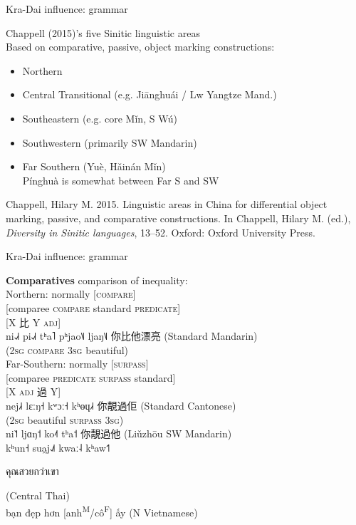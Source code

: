 \documentclass{beamer}
\begin{document}
\begin{frame}[fragile]{Kra-Dai influence: grammar}

Chappell (2015)'s five Sinitic linguistic areas\\
\medskip
Based on comparative, passive, object marking constructions:
\medskip
\begin{itemize}
    \item Northern\\
    \item Central Transitional (e.g. Jiānghuái / Lw Yangtze Mand.)\\
    \item Southeastern (e.g. core Mǐn, S Wú)\\
    \item Southwestern (primarily SW Mandarin)\\
    \item Far Southern (Yuè, Hǎinán Mǐn)\\
    {\scriptsize Pínghuà is somewhat between Far S and SW}
\end{itemize}

\vfill {} {\tiny Chappell, Hilary M. 2015. Linguistic areas in China for differential object marking, passive, and comparative constructions. In Chappell, Hilary M. (ed.), \textit{Diversity in Sinitic languages}, 13–52. Oxford: Oxford University Press.}

\end{frame}

\begin{frame}[fragile]{Kra-Dai influence: grammar}

{\small
\textbf{Comparatives} {\scriptsize comparison of inequality}:\\
\medskip
Northern: normally [\textsc{compare}]\\
{[}comparee \textsc{compare} standard \textsc{predicate}{]}\\
{[}X 比 Y \textsc{adj}{]}\\
\smallskip
ni˨˩˧ pi˨˩˧ tʰa˥ pʰjao˥˩ ljaŋ˥˩ 你比他漂亮 (Standard Mandarin)\\
(\textsc{2sg} \textsc{compare} \textsc{3sg} beautiful)\\
\bigskip
Far-Southern: normally [\textsc{surpass}]\\
{[}comparee \textsc{predicate} \textsc{surpass} standard{]}\\
{[}X \textsc{adj} 過 Y{]}\\
\smallskip
nej˩˧ lɛːŋ˧ kʷɔː˧ kʰɵɥ˩˧ 你靚過佢 (Standard Cantonese)\\
(\textsc{2sg} beautiful \textsc{surpass} \textsc{3sg})\\
\bigskip
ni˥˦ ljɑŋ˦ ko˨˦ tʰa˦ 你靚過他 (Liǔzhōu SW Mandarin)\\
kʰun˧ sua̯j˨˩˦ kwaː˨ kʰaw˦˥ \begin{thai}คุณสวยกว่าเขา\end{thai} (Central Thai)\\
bạn đẹp hơn [anh\textsuperscript{M}/cô\textsuperscript{F}] ấy (N Vietnamese)\\
} 
\end{frame}
\end{document}
